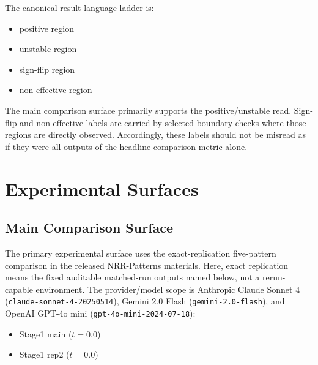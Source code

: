 \documentclass[11pt,a4paper]{article}
\begin{document}
The canonical result-language ladder is:
\begin{itemize}
  \item positive region
  \item unstable region
  \item sign-flip region
  \item non-effective region
\end{itemize}

The main comparison surface primarily supports the positive/unstable read. Sign-flip and non-effective labels are carried by selected boundary checks where those regions are directly observed. Accordingly, these labels should not be misread as if they were all outputs of the headline comparison metric alone.

\section{Experimental Surfaces}
\label{sec:surfaces}

\subsection{Main Comparison Surface}

The primary experimental surface uses the exact-replication five-pattern
comparison in the released NRR-Patterns materials. Here, exact replication
means the fixed auditable matched-run outputs named below, not a rerun-capable
environment. The
provider/model scope is Anthropic Claude Sonnet 4
(\texttt{claude-sonnet-4-20250514}), Gemini 2.0 Flash
(\texttt{gemini-2.0-flash}), and OpenAI GPT-4o mini
(\texttt{gpt-4o-mini-2024-07-18}):
\begin{itemize}
  \item Stage1 main (\(t=0.0\))
  \item Stage1 rep2 (\(t=0.0\))
\end{itemize}
\end{document}
